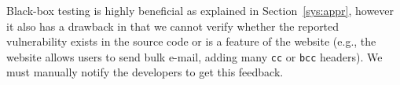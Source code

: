         Black-box testing is highly beneficial as explained in Section~\ref{sys:appr}, however it also has a drawback in that we cannot verify whether the reported vulnerability exists in the source code or is a feature of the website (e.g., the website allows users to send bulk e-mail, adding many \lstinline{cc} or \lstinline{bcc} headers). We must manually notify the developers to get this feedback.





